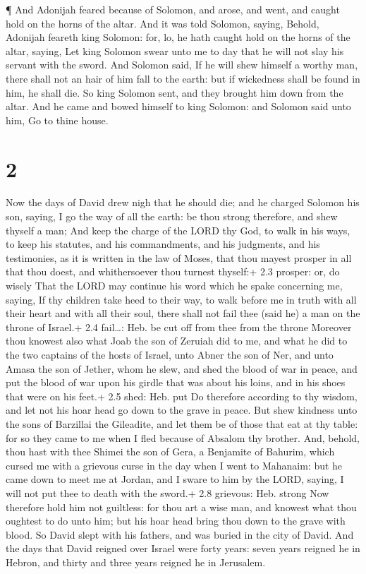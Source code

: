  ¶ And Adonijah feared because of Solomon, and arose, and
went, and caught hold on the horns of the altar.  And it
was told Solomon, saying, Behold, Adonijah feareth king Solomon: for,
lo, he hath caught hold on the horns of the altar, saying, Let king
Solomon swear unto me to day that he will not slay his servant with the
sword.  And Solomon said, If he will shew himself a worthy
man, there shall not an hair of him fall to the earth: but if wickedness
shall be found in him, he shall die.  So king Solomon sent,
and they brought him down from the altar. And he came and bowed himself
to king Solomon: and Solomon said unto him, Go to thine house.

\hypertarget{section-1}{%
\section{2}\label{section-1}}

 Now the days of David drew nigh that he should die; and he
charged Solomon his son, saying,  I go the way of all the
earth: be thou strong therefore, and shew thyself a man; 
And keep the charge of the LORD thy God, to walk in his ways, to keep
his statutes, and his commandments, and his judgments, and his
testimonies, as it is written in the law of Moses, that thou mayest
prosper in all that thou doest, and whithersoever thou turnest thyself:+
2.3 prosper: or, do wisely  That the LORD may continue his
word which he spake concerning me, saying, If thy children take heed to
their way, to walk before me in truth with all their heart and with all
their soul, there shall not fail thee (said he) a man on the throne of
Israel.+ 2.4 fail\ldots: Heb. be cut off from thee from the throne
 Moreover thou knowest also what Joab the son of Zeruiah did
to me, and what he did to the two captains of the hosts of Israel, unto
Abner the son of Ner, and unto Amasa the son of Jether, whom he slew,
and shed the blood of war in peace, and put the blood of war upon his
girdle that was about his loins, and in his shoes that were on his
feet.+ 2.5 shed: Heb. put  Do therefore according to thy
wisdom, and let not his hoar head go down to the grave in peace.
 But shew kindness unto the sons of Barzillai the Gileadite,
and let them be of those that eat at thy table: for so they came to me
when I fled because of Absalom thy brother.  And, behold,
thou hast with thee Shimei the son of Gera, a Benjamite of Bahurim,
which cursed me with a grievous curse in the day when I went to
Mahanaim: but he came down to meet me at Jordan, and I sware to him by
the LORD, saying, I will not put thee to death with the sword.+ 2.8
grievous: Heb. strong  Now therefore hold him not guiltless:
for thou art a wise man, and knowest what thou oughtest to do unto him;
but his hoar head bring thou down to the grave with blood. 
So David slept with his fathers, and was buried in the city of David.
 And the days that David reigned over Israel were forty
years: seven years reigned he in Hebron, and thirty and three years
reigned he in Jerusalem.

